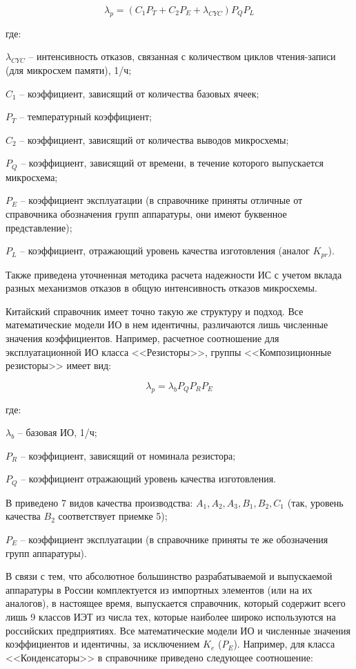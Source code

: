 \documentclass[a4paper,14pt]{article}
\begin{document}
\begin{equation}
	\lambda_{p} = (C_1 P_T + C_2 P_E + \lambda_{CYC}) P_Q P_L
\end{equation}

где:

$\lambda_{CYC}$ -- интенсивность отказов, связанная с количеством циклов чтения-записи (для микросхем памяти), 1/ч; 

$C_1$ -- коэффициент, зависящий от количества базовых ячеек;

$P_T$ -- температурный коэффициент; 

$C_2$ -- коэффициент, зависящий от количества выводов микросхемы; 

$P_Q$ -- коэффициент, зависящий от времени, в течение которого выпускается микросхема;

$P_E$ -- коэффициент эксплуатации (в справочнике приняты отличные от справочника обозначения групп аппаратуры, они имеют буквенное представление); 

$P_L$ -- коэффициент, отражающий уровень качества изготовления (аналог $K_{pr}$).

Также приведена уточненная методика расчета надежности ИС с учетом вклада разных механизмов отказов в общую интенсивность отказов микросхемы.

Китайский справочник имеет точно такую же структуру и подход.
Все математические модели ИО в нем идентичны, различаются лишь численные значения коэффициентов.
Например, расчетное соотношение для эксплуатационной ИО класса <<Резисторы>>, группы <<Композиционные резисторы>> имеет вид:

\begin{equation}
	\lambda_p = \lambda_{b} P_Q P_R P_E
\end{equation} 

где:

$\lambda_{b}$ -- базовая ИО, 1/ч; 

$P_R$ -- коэффициент, зависящий от номинала резистора; 

$P_Q$ -- коэффициент отражающий уровень качества изготовления.

В приведено 7 видов качества производства: $A_1, A_2, A_3, B_1, B_2, C_1$ (так, уровень качества $B_2$ соответствует приемке 5); 

$P_E$ -- коэффициент эксплуатации (в справочнике приняты те же обозначения групп аппаратуры).

В связи с тем, что абсолютное большинство разрабатываемой и выпускаемой аппаратуры в России комплектуется из импортных элементов (или на их аналогов), в настоящее время, выпускается справочник, который содержит всего лишь 9 классов ИЭТ из числа тех, которые наиболее широко используются на российских предприятиях.
Все математические модели ИО и численные значения коэффициентов и идентичны, за исключением $K_e$ ($P_E$).
Например, для класса <<Конденсаторы>> в справочнике приведено следующее соотношение:
\end{document}
